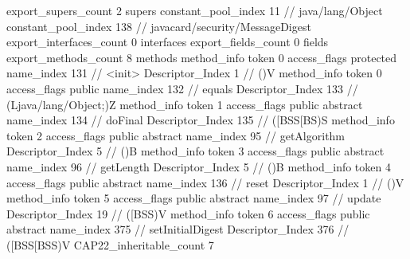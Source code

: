 {{{			export_supers_count	2
			supers {
				constant_pool_index	11		// java/lang/Object
				constant_pool_index	138		// javacard/security/MessageDigest
			}
			export_interfaces_count	0
			interfaces {
			}
			export_fields_count	0
			fields {
			}
			export_methods_count	8
			methods {
				method_info {
					token	0
					access_flags	protected
					name_index	131		// <init>
					Descriptor_Index	1		// ()V
				}
				method_info {
					token	0
					access_flags	public
					name_index	132		// equals
					Descriptor_Index	133		// (Ljava/lang/Object;)Z
				}
				method_info {
					token	1
					access_flags	public abstract
					name_index	134		// doFinal
					Descriptor_Index	135		// ([BSS[BS)S
				}
				method_info {
					token	2
					access_flags	public abstract
					name_index	95		// getAlgorithm
					Descriptor_Index	5		// ()B
				}
				method_info {
					token	3
					access_flags	public abstract
					name_index	96		// getLength
					Descriptor_Index	5		// ()B
				}
				method_info {
					token	4
					access_flags	public abstract
					name_index	136		// reset
					Descriptor_Index	1		// ()V
				}
				method_info {
					token	5
					access_flags	public abstract
					name_index	97		// update
					Descriptor_Index	19		// ([BSS)V
				}
				method_info {
					token	6
					access_flags	public abstract
					name_index	375		// setInitialDigest
					Descriptor_Index	376		// ([BSS[BSS)V
				}
			}
			CAP22_inheritable_count	7
		}
	}
}
